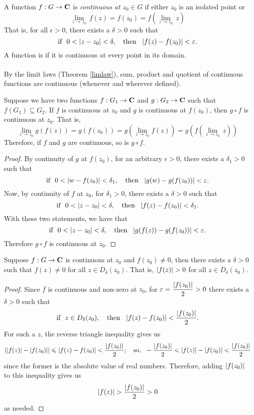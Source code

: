 \begin{definition}
A function $f: G \to \mathbf C$ is \emph{continuous at $z_0 \in G$} if either $z_0$ is an isolated point or 
\[\lim_{z \to z_0}\,f(z) = f(z_0) = f\left(\lim_{z\to z_0}\,z\right)\]
That is, for all $\epsilon > 0$, there exists a $\delta > 0$ such that
\[\text{if }\ 0 < \left\lvert z - z_0\right\rvert < \delta,\quad \text{then }\ \left\lvert f(z) - f(z_0)\right\rvert<\varepsilon.\]
A function is  if it is continuous at every point in its domain.\\
\\
By the limit laws (Theorem \ref{limlaw}), sum, product and quotient of continuous functions are continuous (whenever and wherever defined).
\end{definition}

\medskip

\begin{theorem}\label{composcont}
Suppose we have two functions $f:G_1 \to \mathbf C$ and $g: G_2 \to \mathbf C$ such that $f(G_1) \subseteq G_2$. If $f$ is continuous at $z_0$ and $g$ is continuous at $f(z_0)$, then $g\circ f$ is continuous at $z_0$. That is,
\[\lim_{z \to z_0}g(f(z)) = g(f(z_0)) = g\left(\lim_{z\to z_0}f(z)\right) = g\left(f\left(\lim_{z\to z_0}\,z\right)\right)\]
Therefore, if $f$ and $g$ are continuous, so is $g\circ f$.
\end{theorem}
\begin{proof}
By continuity of $g$ at $f(z_0)$, for an arbitrary $\epsilon > 0$, there exists a $\delta_1 > 0$ such that
\[\text{if }\ 0 < \left\lvert w - f(z_0)\right\rvert < \delta_1,\quad \text{then }\ \left\lvert g(w) - g(f(z_0))\right\rvert<\varepsilon.\]
Now, by continuity of $f$ at $z_0$, for $\delta_1 > 0$, there exists a $\delta > 0$ such that
\[\text{if }\ 0 < \left\lvert z - z_0\right\rvert < \delta,\quad \text{then }\ \left\lvert f(z) - f(z_0)\right\rvert<\delta_1.\]
With these two statements, we have that 
\[\text{if }\ 0 < \left\lvert z - z_0\right\rvert < \delta,\quad \text{then }\ \left\lvert g(f(z)) - g(f(z_0))\right\rvert<\varepsilon.\]
Therefore $g\circ f$ is continuous at $z_0$.
\end{proof}

\medskip

\begin{theorem}
Suppose $f: G \to \mathbf C$ is continuous at $z_0$ and $f(z_0) \neq 0$, then there exists a $\delta > 0$ such that $f(z) \neq 0$ for all $z \in D_\delta(z_0)$. That is, $\left\lvert f(z)\right\rvert > 0$ for all $z \in D_\delta(z_0)$.
\end{theorem}
\begin{proof}
Since $f$ is continuous and non-zero at $z_0$, for $\varepsilon = \dfrac{\left\lvert f(z_0)\right\rvert}{2} > 0$ there exists a $\delta > 0$ such that
\[\text{if }\ z \in D_\delta(z_0),\quad \text{then }\ \left\lvert f(z) - f(z_0)\right\rvert< \frac{\left\lvert f(z_0)\right\rvert}{2}.\]
For such a $z$, the reverse triangle inequality gives us
\[\abs{\abs{f(z)} - \abs{f(z_0)}} \leq \abs{f(z) - f(z_0)}< \frac{\abs{f(z_0)}}{2};\quad \text{so, }\ -\frac{\abs{f(z_0)}}{2} < \abs{f(z)} - \abs{f(z_0)} < \frac{\abs{f(z_0)}}{2}\]
since the former is the absolute value of real numbers. Therefore, adding $\left\lvert f(z_0)\right\rvert$ to this inequality gives us
\[\left\lvert f(z)\right\rvert > \frac{\left\lvert f(z_0)\right\rvert}{2} > 0\]
as needed.
\end{proof}

